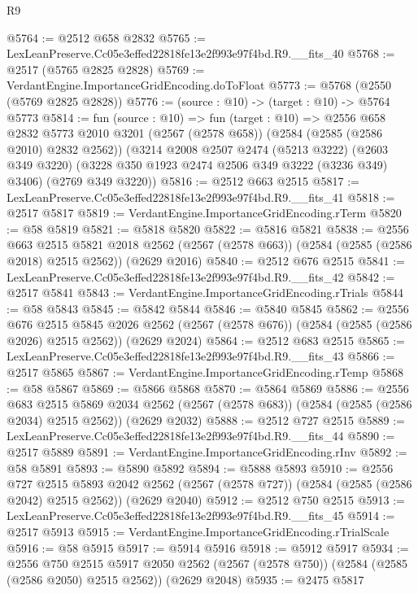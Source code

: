 \begin{lexlean}{R9}
\begin{coremodule}
@5764 := @2512 @658 @2832
@5765 := LexLeanPreserve.Cc05e3effed22818fe13e2f993e97f4bd.R9.__fits_40
@5768 := @2517 (@5765 @2825 @2828)
@5769 := VerdantEngine.ImportanceGridEncoding.doToFloat
@5773 := @5768 (@2550 (@5769 @2825 @2828))
@5776 := (source : @10) -> (target : @10) -> @5764 @5773
@5814 := fun (source : @10) =>
  fun (target : @10) =>
  @2556
    @658
    @2832
    @5773
    @2010
    @3201
    (@2567 (@2578 @658))
    (@2584 (@2585 (@2586 @2010) @2832 @2562))
    (@3214
      @2008
      @2507
      @2474
      (@5213 @3222)
      (@2603 @349 @3220)
      (@3228 @350 @1923 @2474 @2506 @349 @3222 (@3236 @349) @3406)
      (@2769 @349 @3220))
@5816 := @2512 @663 @2515
@5817 := LexLeanPreserve.Cc05e3effed22818fe13e2f993e97f4bd.R9.__fits_41
@5818 := @2517 @5817
@5819 := VerdantEngine.ImportanceGridEncoding.rTerm
@5820 := @58 @5819
@5821 := @5818 @5820
@5822 := @5816 @5821
@5838 := @2556
    @663
    @2515
    @5821
    @2018
    @2562
    (@2567 (@2578 @663))
    (@2584 (@2585 (@2586 @2018) @2515 @2562))
    (@2629 @2016)
@5840 := @2512 @676 @2515
@5841 := LexLeanPreserve.Cc05e3effed22818fe13e2f993e97f4bd.R9.__fits_42
@5842 := @2517 @5841
@5843 := VerdantEngine.ImportanceGridEncoding.rTrials
@5844 := @58 @5843
@5845 := @5842 @5844
@5846 := @5840 @5845
@5862 := @2556
    @676
    @2515
    @5845
    @2026
    @2562
    (@2567 (@2578 @676))
    (@2584 (@2585 (@2586 @2026) @2515 @2562))
    (@2629 @2024)
@5864 := @2512 @683 @2515
@5865 := LexLeanPreserve.Cc05e3effed22818fe13e2f993e97f4bd.R9.__fits_43
@5866 := @2517 @5865
@5867 := VerdantEngine.ImportanceGridEncoding.rTemp
@5868 := @58 @5867
@5869 := @5866 @5868
@5870 := @5864 @5869
@5886 := @2556
    @683
    @2515
    @5869
    @2034
    @2562
    (@2567 (@2578 @683))
    (@2584 (@2585 (@2586 @2034) @2515 @2562))
    (@2629 @2032)
@5888 := @2512 @727 @2515
@5889 := LexLeanPreserve.Cc05e3effed22818fe13e2f993e97f4bd.R9.__fits_44
@5890 := @2517 @5889
@5891 := VerdantEngine.ImportanceGridEncoding.rInv
@5892 := @58 @5891
@5893 := @5890 @5892
@5894 := @5888 @5893
@5910 := @2556
    @727
    @2515
    @5893
    @2042
    @2562
    (@2567 (@2578 @727))
    (@2584 (@2585 (@2586 @2042) @2515 @2562))
    (@2629 @2040)
@5912 := @2512 @750 @2515
@5913 := LexLeanPreserve.Cc05e3effed22818fe13e2f993e97f4bd.R9.__fits_45
@5914 := @2517 @5913
@5915 := VerdantEngine.ImportanceGridEncoding.rTrialScale
@5916 := @58 @5915
@5917 := @5914 @5916
@5918 := @5912 @5917
@5934 := @2556
    @750
    @2515
    @5917
    @2050
    @2562
    (@2567 (@2578 @750))
    (@2584 (@2585 (@2586 @2050) @2515 @2562))
    (@2629 @2048)
@5935 := @2475 @5817

\end{coremodule}
\end{lexlean}
